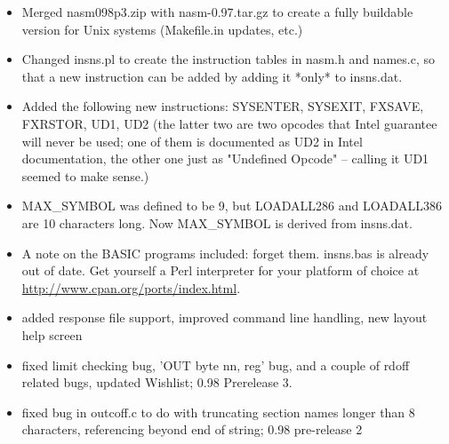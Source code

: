 \begin{itemize}
    \item{Merged nasm098p3.zip with nasm-0.97.tar.gz to create a fully
        buildable version for Unix systems (Makefile.in updates, etc.)}
    \item{Changed insns.pl to create the instruction tables in nasm.h and
        names.c, so that a new instruction can be added by adding it *only*
        to insns.dat.}
    \item{Added the following new instructions: SYSENTER, SYSEXIT, FXSAVE,
        FXRSTOR, UD1, UD2 (the latter two are two opcodes that Intel
        guarantee will never be used; one of them is documented as UD2 in
        Intel documentation, the other one just as "Undefined Opcode" --
        calling it UD1 seemed to make sense.)}
    \item{MAX\_SYMBOL was defined to be 9, but LOADALL286 and LOADALL386 are 10
        characters long. Now MAX\_SYMBOL is derived from insns.dat.}
    \item{A note on the BASIC programs included: forget them. insns.bas is
        already out of date. Get yourself a Perl interpreter for your
        platform of choice at \href{http://www.cpan.org/ports/index.html}
        {http://www.cpan.org/ports/index.html}.}
\end{itemize}


\begin{itemize}
    \item{added response file support, improved command line handling,
        new layout help screen}
    \item{fixed limit checking bug, 'OUT byte nn, reg' bug, and
        a couple of rdoff related bugs, updated Wishlist; 0.98 Prerelease 3.}
\end{itemize}


\begin{itemize}
    \item{fixed bug in outcoff.c to do with truncating section names longer
        than 8 characters, referencing beyond end of string; 0.98 pre-release 2}
\end{itemize}


